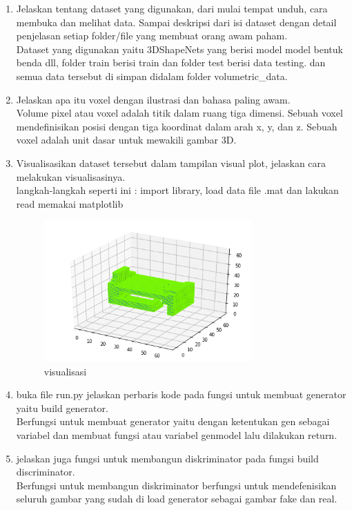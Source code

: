 \begin{enumerate}
\item Jelaskan tentang dataset yang digunakan, dari mulai tempat unduh, cara membuka dan melihat data. Sampai deskripsi dari isi dataset dengan detail penjelasan setiap folder/ﬁle yang membuat orang awam paham.
	\hfill\\
	Dataset yang digunakan yaitu 3DShapeNets yang berisi model model bentuk benda dll, folder train berisi train dan folder test berisi data testing. dan semua data tersebut di simpan didalam folder volumetric\_data.

\item Jelaskan apa itu voxel dengan ilustrasi dan bahasa paling awam.
	\hfill\\
	Volume pixel atau voxel adalah titik dalam ruang tiga dimensi. Sebuah voxel mendefinisikan posisi dengan tiga koordinat dalam arah x, y, dan z. Sebuah voxel adalah unit dasar untuk mewakili gambar 3D.

\item Visualisasikan dataset tersebut dalam tampilan visual plot, jelaskan cara melakukan visualisasinya.
	\hfill\\
	
	langkah-langkah seperti ini :
	import library, load data file .mat dan lakukan read memakai matplotlib
\begin{figure}[H]
    \includegraphics[width=8cm]{figures/1174076/figures8/bed.png}
    \centering
    \caption{visualisasi}
\end{figure}		
	

\item buka ﬁle run.py jelaskan perbaris kode pada fungsi untuk membuat generator yaitu build generator.
	\hfill\\
		
	Berfungsi untuk membuat generator yaitu dengan ketentukan gen sebagai variabel dan membuat fungsi atau variabel genmodel lalu dilakukan return.

\item jelaskan juga fungsi untuk membangun diskriminator pada fungsi build discriminator.
	\hfill\\
		
	Berfungsi untuk membangun diskriminator berfungsi untuk mendefenisikan seluruh gambar yang sudah di load generator sebagai gambar fake dan real.


\end{enumerate}
